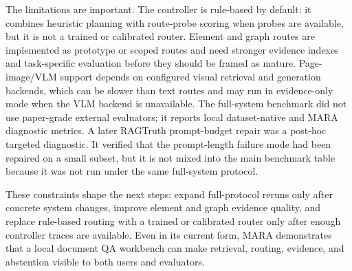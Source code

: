 The limitations are important. The controller is rule-based by default: it combines heuristic planning with route-probe scoring when probes are available, but it is not a trained or calibrated router. Element and graph routes are implemented as prototype or scoped routes and need stronger evidence indexes and task-specific evaluation before they should be framed as mature. Page-image/VLM support depends on configured visual retrieval and generation backends, which can be slower than text routes and may run in evidence-only mode when the VLM backend is unavailable. The full-system benchmark did not use paper-grade external evaluators; it reports local dataset-native and MARA diagnostic metrics. A later RAGTruth prompt-budget repair was a post-hoc targeted diagnostic. It verified that the prompt-length failure mode had been repaired on a small subset, but it is not mixed into the main benchmark table because it was not run under the same full-system protocol.

These constraints shape the next steps: expand full-protocol reruns only after concrete system changes, improve element and graph evidence quality, and replace rule-based routing with a trained or calibrated router only after enough controller traces are available. Even in its current form, MARA demonstrates that a local document QA workbench can make retrieval, routing, evidence, and abstention visible to both users and evaluators.
